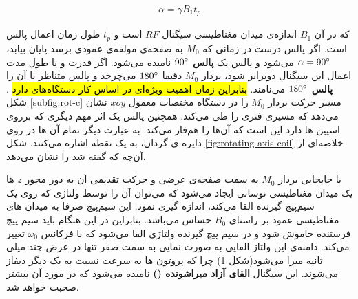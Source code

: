 \removevspace
\begin{align}
	\alpha = \gamma B_1 t_p
\end{align}




که در آن $B_1$ اندازه‌ی میدان مغناطیسی سیگنال $RF$ است و $t_p$ طول زمان اعمال پالس است. اگر پالس  درست در زمانی که $M_0$ به صفحه‌ی مولفه‌‌ی عمودی برسد پایان بیابد، $\alpha=90\degree$ می‌شود و پالس  یک \textbf{پالس $90\degree$} نامیده می‌شود. اگر قدرت و یا طول مدت اعمال این سیگنال دوبرابر شود، بردار $M_0$ دقیقا $180\degree$ می‌چرخد و پالس متناظر با آن را \textbf{پالس $180\degree$} می‌نامند. 
\hl{بنابراین زمان اهمیت ویژه‌ای در اساس کار دستگاه‌های \mri دارد}
\cite{McRobbie}.
شکل \ref{subfig:rot-c}
مسیر حرکت بردار $M_0$ را در دستگاه مختصات معمول $xoy$ نشان می‌دهد که مسیری فنری را طی می‌کند.
همچنین پالس  یک اثر مهم دیگری که بر‌روی اسپین ها دارد این است که آن‌ها را هم‌فاز می‌کند. به عبارت‌ دیگر تمام آن ها در روی دایره ی گردان، به یک نقطه اشاره می‌کنند. شکل \ref{fig:rotating-axis-coil} خلاصه‌ای از آن‌چه که گفته شد را نشان می‌دهد.



 
 
 \begin{figure}
 	\centering
 	\caption{}
 	\label{fig:signal-recived}
 \end{figure}
 
 
 
 با جابجایی بردار $M_0$ به سمت صفحه‌ی عرضی و حرکت تقدیمی آن به دور محور $z$ ها یک میدان مغناطیسی نوسانی ایجاد می‌شود که می‌توان آن را توسط ولتاژی که روی یک سیم‌پیچ گیرنده القا می‌کند، اندازه گیری نمود. 
 این سیم‌پیچ صرفا به میدان های مغناطیسی عمود بر راستای $B_0$ حساس می‌باشد. بنابراین در این هنگام باید سیم پیچ فرستنده خاموش شود و در سیم پیچ گیرنده ولتاژی القا می‌شود که با فرکانس $\omega_0$ تغییر می‌کند. دامنه‌ی این ولتاژ القایی به صورت نمایی به سمت صفر تنها در عرض چند میلی ثانیه میرا می‌شود(شکل \ref{fig:signal-recived})
چرا که پروتون ها به سرعت نسبت به یک دیگر دیفاز 
می‌شوند. این سیگنال \textbf{القای آزاد میرا‌شونده ()}
نامیده می‌شود\cite{JosephHornak}
 که در مورد آن بیشتر صحبت خواهد شد.

